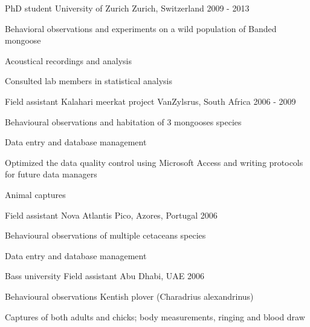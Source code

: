 \begin{cventries}
  \cventry
    {PhD student} %
    {University of Zurich} %
    {Zurich, Switzerland} %
    {2009 - 2013} %
    {
      \begin{cvitems} %
        \item {Behavioral observations and experiments on a wild population of Banded mongoose}
        \item {Acoustical recordings and analysis}
        \item  Consulted lab members in statistical analysis
      \end{cvitems}
    }

\cventry
    {Field assistant} %
    {Kalahari meerkat project} %
    {VanZylsrus, South Africa} %
    {2006 - 2009} %
    {
      \begin{cvitems} %
        \item {Behavioural observations and habitation of 3 mongooses species}
        \item {Data entry and database management}
        \item Optimized the data quality control using Microsoft Access and writing protocols for future data managers
        \item Animal captures
      \end{cvitems}
    }

    \cventry
    {Field assistant} %
    {Nova Atlantis} %
    {Pico, Azores, Portugal} %
    {2006} %
    {
      \begin{cvitems} %
        \item {Behavioural observations of multiple cetaceans species}
        \item {Data entry and database management}
      \end{cvitems}
    }

       \cventry
    {Bass university} %
    {Field assistant} %
    {Abu Dhabi, UAE} %
    {2006} %
    {
      \begin{cvitems} %
        \item {Behavioural observations Kentish plover (Charadrius alexandrinus)}
        \item {Captures of both adults and chicks; body measurements, ringing and blood draw}
       \end{cvitems}
    }
    

 
\end{cventries}
